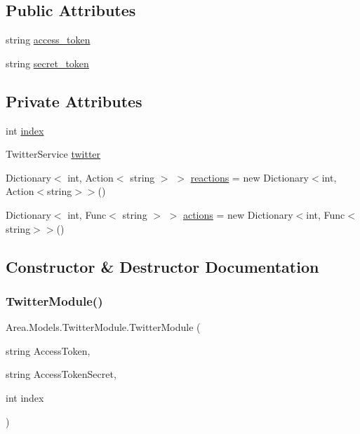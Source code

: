 \subsection*{Public Attributes}
\begin{DoxyCompactItemize}
\item 
string \mbox{\hyperlink{classArea_1_1Models_1_1TwitterModule_a1e54918961c13e477bf3b1db6221d409}{access\+\_\+token}}
\item 
string \mbox{\hyperlink{classArea_1_1Models_1_1TwitterModule_ad21df823c729272d61536f84e8c74616}{secret\+\_\+token}}
\end{DoxyCompactItemize}
\subsection*{Private Attributes}
\begin{DoxyCompactItemize}
\item 
int \mbox{\hyperlink{classArea_1_1Models_1_1TwitterModule_a287e1b50557ce5e03cf8a5cf70ed2696}{index}}
\item 
Twitter\+Service \mbox{\hyperlink{classArea_1_1Models_1_1TwitterModule_a7ebe89d232b1da290dec450921d988d1}{twitter}}
\item 
Dictionary$<$ int, Action$<$ string $>$ $>$ \mbox{\hyperlink{classArea_1_1Models_1_1TwitterModule_ab7ac239101796d41d58c6a481e8cce06}{reactions}} = new Dictionary$<$int, Action$<$string$>$$>$()
\item 
Dictionary$<$ int, Func$<$ string $>$ $>$ \mbox{\hyperlink{classArea_1_1Models_1_1TwitterModule_aedfc4fc98bbb3e3810e39614fdb2cb39}{actions}} = new Dictionary$<$int, Func$<$string$>$$>$()
\end{DoxyCompactItemize}


\subsection{Constructor \& Destructor Documentation}
\mbox{\label{classArea_1_1Models_1_1TwitterModule_aa0724f8694608093cb2f666a261b6a17}} 
\subsubsection{\texorpdfstring{Twitter\+Module()}{TwitterModule()}}
{\footnotesize\ttfamily Area.\+Models.\+Twitter\+Module.\+Twitter\+Module (\begin{DoxyParamCaption}\item[{string}]{Access\+Token,  }\item[{string}]{Access\+Token\+Secret,  }\item[{int}]{index }\end{DoxyParamCaption})\hspace{0.3cm}{\ttfamily [inline]}}



